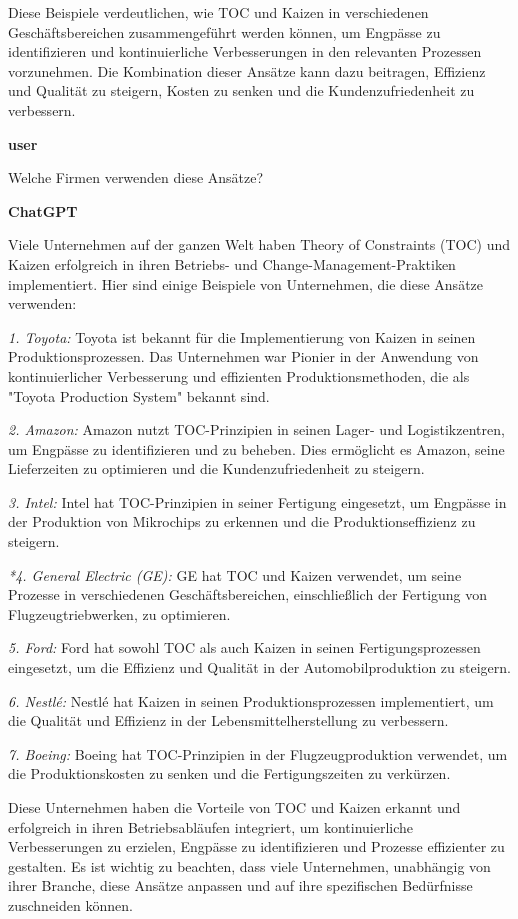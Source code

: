 Diese Beispiele verdeutlichen, wie TOC und Kaizen in verschiedenen Geschäftsbereichen zusammengeführt werden können, um Engpässe zu identifizieren und kontinuierliche Verbesserungen in den relevanten Prozessen vorzunehmen. Die Kombination dieser Ansätze kann dazu beitragen, Effizienz und Qualität zu steigern, Kosten zu senken und die Kundenzufriedenheit zu verbessern.

\textbf{user}

Welche Firmen verwenden diese Ansätze? 
 
\textbf{ChatGPT}

Viele Unternehmen auf der ganzen Welt haben Theory of Constraints (TOC) und Kaizen erfolgreich in ihren Betriebs- und Change-Management-Praktiken implementiert. Hier sind einige Beispiele von Unternehmen, die diese Ansätze verwenden:

\textit{1. Toyota:} Toyota ist bekannt für die Implementierung von Kaizen in seinen Produktionsprozessen. Das Unternehmen war Pionier in der Anwendung von kontinuierlicher Verbesserung und effizienten Produktionsmethoden, die als "Toyota Production System" bekannt sind.

\textit{2. Amazon:} Amazon nutzt TOC-Prinzipien in seinen Lager- und Logistikzentren, um Engpässe zu identifizieren und zu beheben. Dies ermöglicht es Amazon, seine Lieferzeiten zu optimieren und die Kundenzufriedenheit zu steigern.

\textit{3. Intel:} Intel hat TOC-Prinzipien in seiner Fertigung eingesetzt, um Engpässe in der Produktion von Mikrochips zu erkennen und die Produktionseffizienz zu steigern.

\textit{*4. General Electric (GE):} GE hat TOC und Kaizen verwendet, um seine Prozesse in verschiedenen Geschäftsbereichen, einschließlich der Fertigung von Flugzeugtriebwerken, zu optimieren.

\textit{5. Ford:} Ford hat sowohl TOC als auch Kaizen in seinen Fertigungsprozessen eingesetzt, um die Effizienz und Qualität in der Automobilproduktion zu steigern.

\textit{6. Nestlé:} Nestlé hat Kaizen in seinen Produktionsprozessen implementiert, um die Qualität und Effizienz in der Lebensmittelherstellung zu verbessern.

\textit{7. Boeing:} Boeing hat TOC-Prinzipien in der Flugzeugproduktion verwendet, um die Produktionskosten zu senken und die Fertigungszeiten zu verkürzen.

Diese Unternehmen haben die Vorteile von TOC und Kaizen erkannt und erfolgreich in ihren Betriebsabläufen integriert, um kontinuierliche Verbesserungen zu erzielen, Engpässe zu identifizieren und Prozesse effizienter zu gestalten. Es ist wichtig zu beachten, dass viele Unternehmen, unabhängig von ihrer Branche, diese Ansätze anpassen und auf ihre spezifischen Bedürfnisse zuschneiden können.

